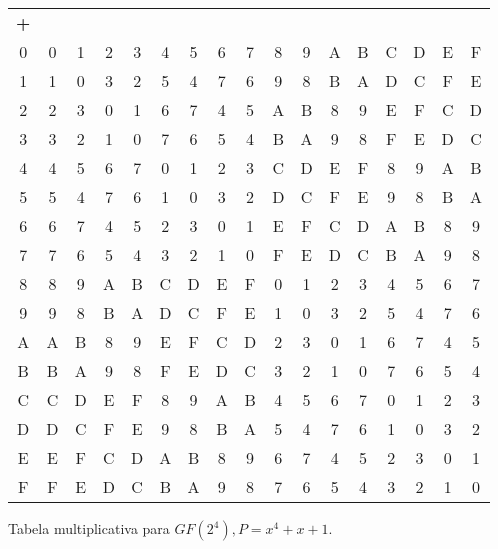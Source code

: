 \documentclass[fleqn]{../sftex/sftex}
\begin{document}
\begin{enumerate}[label= (\textbf{\arabic*})]
\begin{tabular}{c *{16}{>{\color[gray]{0.35}}c}}
\textbf{+} & \color{black}{0} & \color{black}{1} & \color{black}{2}
& \color{black}{3} & \color{black}{4} & \color{black}{5} & \color{black}{6}
& \color{black}{7} & \color{black}{8} & \color{black}{9} & \color{black}{A}
& \color{black}{B} & \color{black}{C} & \color{black}{D} & \color{black}{E}
& \color{black}{F} \\
0 & 0 & 1 & 2 & 3 & 4 & 5 & 6 & 7 & 8 & 9 & A & B & C & D & E & F \\
1 & 1 & 0 & 3 & 2 & 5 & 4 & 7 & 6 & 9 & 8 & B & A & D & C & F & E \\
2 & 2 & 3 & 0 & 1 & 6 & 7 & 4 & 5 & A & B & 8 & 9 & E & F & C & D \\
3 & 3 & 2 & 1 & 0 & 7 & 6 & 5 & 4 & B & A & 9 & 8 & F & E & D & C \\
4 & 4 & 5 & 6 & 7 & 0 & 1 & 2 & 3 & C & D & E & F & 8 & 9 & A & B \\
5 & 5 & 4 & 7 & 6 & 1 & 0 & 3 & 2 & D & C & F & E & 9 & 8 & B & A \\
6 & 6 & 7 & 4 & 5 & 2 & 3 & 0 & 1 & E & F & C & D & A & B & 8 & 9 \\
7 & 7 & 6 & 5 & 4 & 3 & 2 & 1 & 0 & F & E & D & C & B & A & 9 & 8 \\
8 & 8 & 9 & A & B & C & D & E & F & 0 & 1 & 2 & 3 & 4 & 5 & 6 & 7 \\
9 & 9 & 8 & B & A & D & C & F & E & 1 & 0 & 3 & 2 & 5 & 4 & 7 & 6 \\
A & A & B & 8 & 9 & E & F & C & D & 2 & 3 & 0 & 1 & 6 & 7 & 4 & 5 \\
B & B & A & 9 & 8 & F & E & D & C & 3 & 2 & 1 & 0 & 7 & 6 & 5 & 4 \\
C & C & D & E & F & 8 & 9 & A & B & 4 & 5 & 6 & 7 & 0 & 1 & 2 & 3 \\
D & D & C & F & E & 9 & 8 & B & A & 5 & 4 & 7 & 6 & 1 & 0 & 3 & 2 \\
E & E & F & C & D & A & B & 8 & 9 & 6 & 7 & 4 & 5 & 2 & 3 & 0 & 1 \\
F & F & E & D & C & B & A & 9 & 8 & 7 & 6 & 5 & 4 & 3 & 2 & 1 & 0 \\
\end{tabular}

Tabela multiplicativa para $GF(2^4), P = x^4 + x + 1$.


\end{enumerate}
\end{document}
